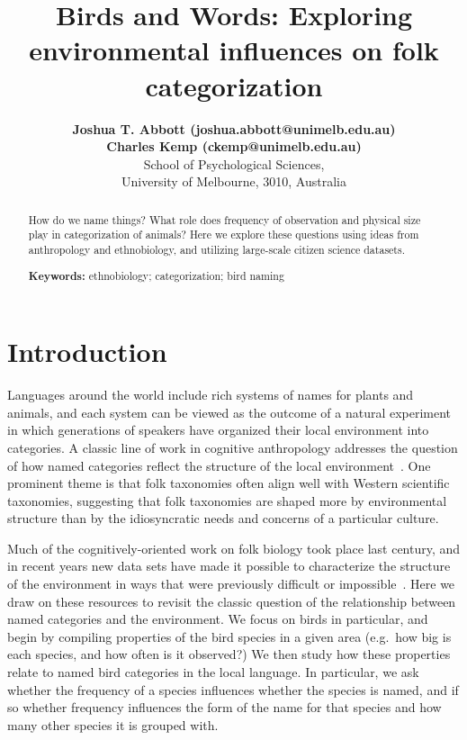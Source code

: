 \documentclass[10pt,letterpaper]{article}
\title{Birds and Words: Exploring environmental influences on folk categorization}
\author{{\large \bf Joshua T. Abbott (joshua.abbott@unimelb.edu.au)} \\
 {\large \bf Charles Kemp (ckemp@unimelb.edu.au)} \\
  School of Psychological Sciences,  \\
  University of Melbourne, 3010, Australia}
\begin{document}
\maketitle


\begin{abstract}
How do we name things? What role does frequency of observation and physical size play in categorization of animals? Here we explore these questions using ideas from anthropology and ethnobiology, and utilizing large-scale citizen science datasets.

\textbf{Keywords:} 
ethnobiology; categorization; bird naming
\end{abstract}


\section{Introduction}



Languages around the world include rich systems of names for plants and animals, and each system can be viewed as the outcome of a natural experiment in which generations of speakers have organized their local environment into categories. A classic line of work in cognitive anthropology addresses the question of how named categories reflect the structure of the local environment~\cite{berlin2014ethnobiological}. One prominent theme is that folk taxonomies often align well with Western scientific taxonomies, suggesting that folk taxonomies are shaped more by environmental structure than by the idiosyncratic needs and concerns of a particular culture. 

Much of the cognitively-oriented work on folk biology took place last century, and in recent years new data sets have made it possible to characterize the structure of the environment in ways that were previously difficult or impossible~\cite{sullivan2009ebird,wilman2014eltontraits}.
 Here we draw on these resources to revisit the classic question of the relationship between named categories and the environment. We focus on birds in particular, and begin by compiling properties of the bird species in a given area (e.g.\ how big is each species, and how often is it observed?) We then study how these properties relate to named bird categories in the local language. In particular, we ask whether the frequency of a species influences whether the species is named, and if so whether frequency influences the form of the name for that species and how many other species it is grouped with. 
\end{document}
